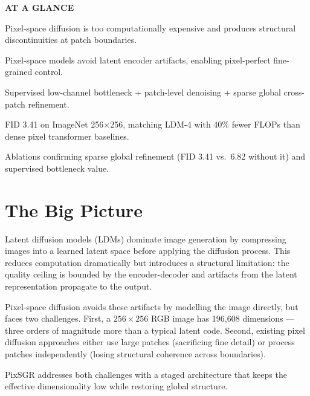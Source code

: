 \documentclass[10pt,twocolumn]{article}
\begin{document}
\begin{mdframed}[backgroundcolor=boxgray,linecolor=rulered,linewidth=1pt,
    innerleftmargin=6pt,innerrightmargin=6pt,
    innertopmargin=6pt,innerbottommargin=6pt]
\textbf{\small AT A GLANCE}\par\vspace{4pt}
\begin{description}[leftmargin=0pt,labelsep=4pt,itemsep=2pt,parsep=0pt,
    font=\small\bfseries]
  \item[Problem:] Pixel-space diffusion is too computationally expensive
    and produces structural discontinuities at patch boundaries.
  \item[Why it matters:] Pixel-space models avoid latent encoder
    artifacts, enabling pixel-perfect fine-grained control.
  \item[Method:] Supervised low-channel bottleneck + patch-level
    denoising + sparse global cross-patch refinement.
  \item[Result:] FID 3.41 on ImageNet 256$\times$256, matching LDM-4
    with 40\% fewer FLOPs than dense pixel transformer baselines.
  \item[Evidence:] Ablations confirming sparse global refinement
    (FID 3.41 vs.\ 6.82 without it) and supervised bottleneck value.
\end{description}
\end{mdframed}

\section{The Big Picture}

Latent diffusion models (LDMs) dominate image generation by compressing
images into a learned latent space before applying the diffusion process.
This reduces computation dramatically but introduces a structural
limitation: the quality ceiling is bounded by the encoder-decoder and
artifacts from the latent representation propagate to the output.

Pixel-space diffusion avoids these artifacts by modelling the image
directly, but faces two challenges. First, a $256\times256$ RGB image
has 196{,}608 dimensions --- three orders of magnitude more than a typical
latent code. Second, existing pixel diffusion approaches either use
large patches (sacrificing fine detail) or process patches independently
(losing structural coherence across boundaries).

PixSGR addresses both challenges with a staged architecture that keeps
the effective dimensionality low while restoring global structure.
\end{document}
